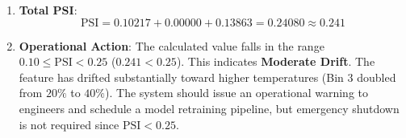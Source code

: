 \begin{enumerate}
\begin{enumerate}
\begin{itemize}
            \item \textbf{Bin 2}:
            \begin{align*}
            (P_2 - Q_2) &= 0.30 - 0.30 = 0.00 \\
            \frac{P_2}{Q_2} &= \frac{0.30}{0.30} = 1.00 \implies \ln(1.00) = 0.00000 \\
            \text{Contrib}_2 &= (0.00) \times (0.00000) = \mathbf{0.00000}
            \end{align*}

            \item \textbf{Bin 3}:
            \begin{align*}
            (P_3 - Q_3) &= 0.40 - 0.20 = +0.20 \\
            \frac{P_3}{Q_3} &= \frac{0.40}{0.20} = 2.00 \implies \ln(2.00) \approx +0.69315 \\
            \text{Contrib}_3 &= (+0.20) \times (+0.69315) = \mathbf{+0.13863}
            \end{align*}
        \end{itemize}

        \item \textbf{Total PSI}:
        \begin{equation*}
        \text{PSI} = 0.10217 + 0.00000 + 0.13863 = \mathbf{0.24080} \approx \mathbf{0.241}
        \end{equation*}

        \item \textbf{Operational Action}:
        The calculated value falls in the range $0.10 \le \text{PSI} < 0.25$ ($0.241 < 0.25$). This indicates \textbf{Moderate Drift}. The feature has drifted substantially toward higher temperatures (Bin 3 doubled from $20\%$ to $40\%$). The system should issue an operational warning to engineers and schedule a model retraining pipeline, but emergency shutdown is not required since $\text{PSI} < 0.25$.
    \end{enumerate}


\end{enumerate}
